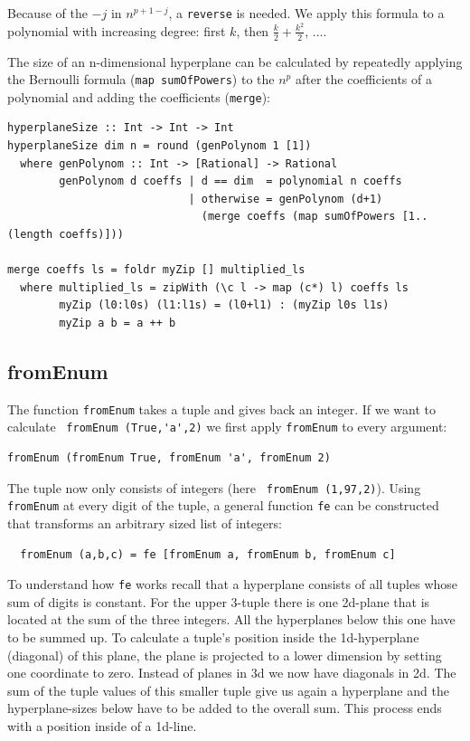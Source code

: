 \documentclass{tmr}
\newcommand{\authornote}[3]{{\color{#2} {\sc #1}: #3}}
\newcommand\bay[1]{\authornote{edward}{blue}{#1}}
\begin{document}
Because of the $-j$ in $n^{p+1-j}$, a \verb|reverse| is needed.
We apply this formula to a polynomial with increasing degree: first $k$, then $\frac{k}{2} + \frac{k^2}{2}$, ....

The size of an n-dimensional hyperplane can be calculated by repeatedly applying the Bernoulli formula (\verb|map sumOfPowers|) to the $n^p$ after the coefficients of a polynomial and adding the coefficients (\verb|merge|):

\small
\begin{Verbatim}
hyperplaneSize :: Int -> Int -> Int
hyperplaneSize dim n = round (genPolynom 1 [1])
  where genPolynom :: Int -> [Rational] -> Rational
        genPolynom d coeffs | d == dim  = polynomial n coeffs
                            | otherwise = genPolynom (d+1)
                              (merge coeffs (map sumOfPowers [1..(length coeffs)]))

merge coeffs ls = foldr myZip [] multiplied_ls
  where multiplied_ls = zipWith (\c l -> map (c*) l) coeffs ls
        myZip (l0:l0s) (l1:l1s) = (l0+l1) : (myZip l0s l1s)
        myZip a b = a ++ b
\end{Verbatim}

\subsection{fromEnum}

The function \verb|fromEnum| takes a tuple and gives back an integer. If we want to calculate \eg \ \verb|fromEnum (True,'a',2)| we first apply \verb|fromEnum| to every argument: 

\begin{Verbatim}
fromEnum (fromEnum True, fromEnum 'a', fromEnum 2)
\end{Verbatim}

The tuple now only consists of integers (here \verb| fromEnum (1,97,2)|).
Using \verb|fromEnum| at every digit of the tuple, a general function \verb|fe| can be constructed that transforms an arbitrary sized list of integers: %

\begin{Verbatim}
  fromEnum (a,b,c) = fe [fromEnum a, fromEnum b, fromEnum c]
\end{Verbatim}

To understand how \verb|fe| works recall that a hyperplane consists of all tuples whose sum of digits is constant. For the upper 3-tuple there is one 2d-plane that is located at the sum of the three integers. All the hyperplanes below this one have to be summed up. To calculate a tuple's position inside the 1d-hyperplane (diagonal) of this plane, the plane is projected to a lower dimension by setting one coordinate to zero. Instead of planes in 3d we now have diagonals in 2d. The sum of the tuple values of this smaller tuple give us again a hyperplane and the  hyperplane-sizes below have to be added to the overall sum. This process ends with a position inside of a 1d-line.
\end{document}
